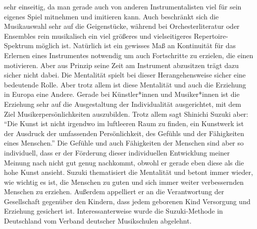 sehr einseitig, da man gerade auch von anderen Instrumentalisten viel für sein
eigenes Spiel mitnehmen und imitieren kann. Auch beschränkt sich die
Musikauswahl sehr auf die Geigenstücke, während bei Orchesterliteratur oder
Ensembles rein musikalisch ein viel größeres und vielseitigeres
Repertoire-Spektrum möglich ist. Natürlich ist ein gewisses Maß an Kontinuität
für das Erlernen eines Instrumentes notwendig um auch Fortschritte zu erzielen,
die einen motivieren. Aber aus Prinzip seine Zeit am Instrument abzusitzen trägt
dazu sicher nicht dabei. Die Mentalität spielt bei dieser Herangehensweise
sicher eine bedeutende Rolle. Aber trotz allem ist diese Mentalität und auch die
Erziehung in Europa eine Andere. Gerade bei Künstler*innen und Musiker*innen ist
die Erziehung sehr auf die Ausgestaltung der Individualität ausgerichtet, mit
dem Ziel Musikerpersönlichkeiten auszubilden. Trotz allem sagt Shinichi Suzuki
aber: \enquote{Die Kunst ist nicht irgendwo im luftleeren Raum zu finden, ein
Kunstwerk ist der Ausdruck der umfassenden Persönlichkeit, des Gefühls und der
Fähigkeiten eines Menschen.} \autocite[103]{suzuki:erziehung_ist_liebe} Die
Gefühle und auch Fähigkeiten der Menschen sind aber so individuell, dass er der
Förderung dieser individuellen Entwicklung meiner Meinung nach nicht gut genug
nachkommt, obwohl er gerade eben diese als die hohe Kunst ansieht. Suzuki
thematisiert die Mentalität und betont immer wieder, wie wichtig es ist, die
Menschen zu guten und sich immer weiter verbessernden Menschen zu erziehen.
Außerdem appelliert er an die Verantwortung der Gesellschaft gegenüber den
Kindern, dass jedem geborenen Kind Versorgung und Erziehung gesichert ist.
\autocite[130]{suzuki:erziehung_ist_liebe} Interessanterweise wurde die
Suzuki-Methode in Deutschland vom Verband deutscher Musikschulen abgelehnt.
\autocite[49]{ernst:die_zukunftsfaehige_musikschule}
